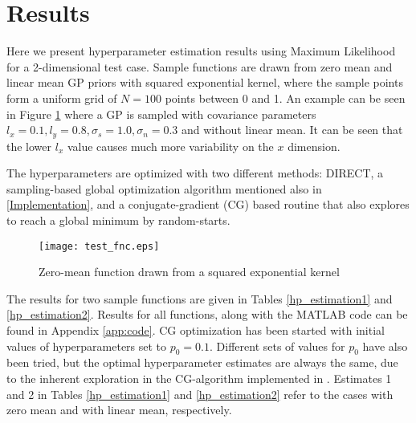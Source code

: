 \section{Results}

Here we present hyperparameter estimation results using Maximum Likelihood for a 2-dimensional test case. Sample functions are drawn from zero mean and linear mean GP priors with squared exponential kernel, where the sample points form a uniform grid of $N = 100$ points between 0 and 1. An example can be seen in Figure \ref{fig:hp_test} where a GP is sampled with covariance parameters $l_x = 0.1, l_y = 0.8, \sigma_s = 1.0, \sigma_n = 0.3$ and without linear mean. It can be seen that the lower $l_x$ value causes much more variability on the $x$ dimension.

The hyperparameters are optimized with two different methods: DIRECT, a sampling-based global optimization algorithm mentioned also in \ref{Implementation}, and a conjugate-gradient (CG) based routine that also explores to reach a global minimum by random-starts. 

\begin{figure}
\center
\texttt{[image: test\_fnc.eps]}			
\caption{Zero-mean function drawn from a squared exponential kernel}
\label{fig:hp_test}
\end{figure}

The results for two sample functions are given in Tables \ref{hp_estimation1} and \ref{hp_estimation2}. Results for all functions, along with the MATLAB code can be found in Appendix \ref{app:code}. CG optimization has been started with initial values of hyperparameters set to $p_0 = 0.1$. Different sets of values for $p_0$ have also been tried, but the optimal hyperparameter estimates are always the same, due to the inherent exploration in the CG-algorithm implemented in \cite{GPML}. Estimates 1 and 2 in Tables \ref{hp_estimation1} and \ref{hp_estimation2} refer to the cases with zero mean and with linear mean, respectively.

\begin{table}
\renewcommand{\arraystretch}{1.3}
\caption{Hyperparameter estimation results - test case 1}
\label{hp_estimation1}
\centering
{}
\end{table}

